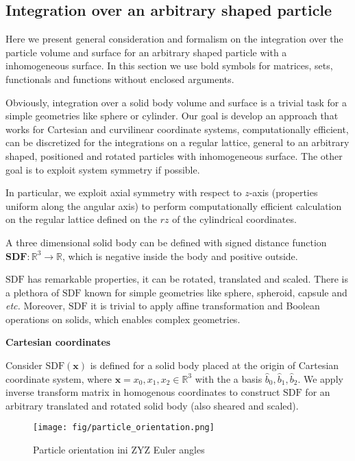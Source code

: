 \documentclass[10pt, a4paper]{article}
\begin{document}
\subsection*{Integration over an arbitrary shaped particle}
\begin{multicols}{2}

Here we present general consideration and formalism on the integration over the particle volume and surface
for an arbitrary shaped particle with a inhomogeneous surface.
In this section we use bold symbols for matrices, sets, functionals and functions without enclosed arguments. 

Obviously, integration over a solid body volume and surface is a trivial task for a simple geometries like sphere or cylinder.
Our goal is develop an approach that works for Cartesian and curvilinear coordinate systems, 
computationally efficient, 
can be discretized for the integrations on a regular lattice, 
general to an arbitrary shaped, positioned and rotated particles with inhomogeneous surface.
The other goal is to exploit system symmetry if possible.

In particular, we exploit axial symmetry with respect to $z$-axis (properties uniform along the angular axis) to perform computationally efficient calculation on the regular lattice defined on the $rz$ of the cylindrical coordinates.

A three dimensional solid body can be defined with signed distance function $\bm{\textrm{SDF}}: \mathbb{R}^3 \to \mathbb{R}$, which is negative inside the body and positive outside.

$\textrm{SDF}$ has remarkable properties, it can be rotated, translated and scaled. 
There is a plethora of $\textrm{SDF}$ known for simple geometries like sphere, spheroid, capsule and \textit{etc.}
Moreover, $\textrm{SDF}$ it is trivial to apply affine transformation and Boolean operations on solids, which enables complex geometries.

\textbf{Cartesian coordinates}

Consider $\textrm{SDF}(\bm{x})$ is defined for a solid body placed at the origin of Cartesian coordinate system, where $\bm{x} = x_0, x_1, x_2 \in \mathbb{R}^3$ with the a basis $\hat{b}_0, \hat{b}_1, \hat{b}_2$.
We apply inverse transform matrix in homogenous coordinates to construct $\textrm{SDF}$ for an arbitrary translated and rotated solid body (also sheared and scaled).

\begin{figure}[H]
    \centering
    \texttt{[image: fig/particle\_orientation.png]}
    \caption{
        Particle orientation ini ZYZ Euler angles
    }
    \label{fig:particle_orientation}
\end{figure}



\end{multicols}
\end{document}
